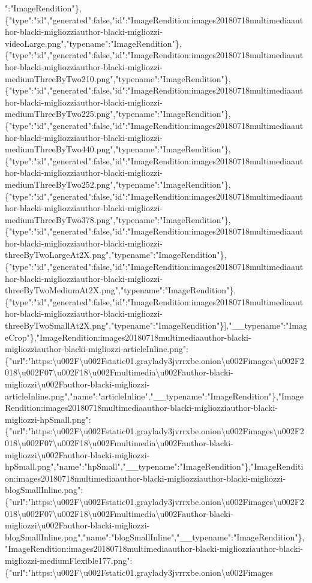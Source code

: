 ":"ImageRendition"\},\{"type":"id","generated":false,"id":"ImageRendition:images20180718multimediaauthor-blacki-migliozziauthor-blacki-migliozzi-videoLarge.png","typename":"ImageRendition"\},\{"type":"id","generated":false,"id":"ImageRendition:images20180718multimediaauthor-blacki-migliozziauthor-blacki-migliozzi-mediumThreeByTwo210.png","typename":"ImageRendition"\},\{"type":"id","generated":false,"id":"ImageRendition:images20180718multimediaauthor-blacki-migliozziauthor-blacki-migliozzi-mediumThreeByTwo225.png","typename":"ImageRendition"\},\{"type":"id","generated":false,"id":"ImageRendition:images20180718multimediaauthor-blacki-migliozziauthor-blacki-migliozzi-mediumThreeByTwo440.png","typename":"ImageRendition"\},\{"type":"id","generated":false,"id":"ImageRendition:images20180718multimediaauthor-blacki-migliozziauthor-blacki-migliozzi-mediumThreeByTwo252.png","typename":"ImageRendition"\},\{"type":"id","generated":false,"id":"ImageRendition:images20180718multimediaauthor-blacki-migliozziauthor-blacki-migliozzi-mediumThreeByTwo378.png","typename":"ImageRendition"\},\{"type":"id","generated":false,"id":"ImageRendition:images20180718multimediaauthor-blacki-migliozziauthor-blacki-migliozzi-threeByTwoLargeAt2X.png","typename":"ImageRendition"\},\{"type":"id","generated":false,"id":"ImageRendition:images20180718multimediaauthor-blacki-migliozziauthor-blacki-migliozzi-threeByTwoMediumAt2X.png","typename":"ImageRendition"\},\{"type":"id","generated":false,"id":"ImageRendition:images20180718multimediaauthor-blacki-migliozziauthor-blacki-migliozzi-threeByTwoSmallAt2X.png","typename":"ImageRendition"\}{]},"\_\_typename":"ImageCrop"\},"ImageRendition:images20180718multimediaauthor-blacki-migliozziauthor-blacki-migliozzi-articleInline.png":\{"url":"https:\textbackslash{}u002F\textbackslash{}u002Fstatic01.graylady3jvrrxbe.onion\textbackslash{}u002Fimages\textbackslash{}u002F2018\textbackslash{}u002F07\textbackslash{}u002F18\textbackslash{}u002Fmultimedia\textbackslash{}u002Fauthor-blacki-migliozzi\textbackslash{}u002Fauthor-blacki-migliozzi-articleInline.png","name":"articleInline","\_\_typename":"ImageRendition"\},"ImageRendition:images20180718multimediaauthor-blacki-migliozziauthor-blacki-migliozzi-hpSmall.png":\{"url":"https:\textbackslash{}u002F\textbackslash{}u002Fstatic01.graylady3jvrrxbe.onion\textbackslash{}u002Fimages\textbackslash{}u002F2018\textbackslash{}u002F07\textbackslash{}u002F18\textbackslash{}u002Fmultimedia\textbackslash{}u002Fauthor-blacki-migliozzi\textbackslash{}u002Fauthor-blacki-migliozzi-hpSmall.png","name":"hpSmall","\_\_typename":"ImageRendition"\},"ImageRendition:images20180718multimediaauthor-blacki-migliozziauthor-blacki-migliozzi-blogSmallInline.png":\{"url":"https:\textbackslash{}u002F\textbackslash{}u002Fstatic01.graylady3jvrrxbe.onion\textbackslash{}u002Fimages\textbackslash{}u002F2018\textbackslash{}u002F07\textbackslash{}u002F18\textbackslash{}u002Fmultimedia\textbackslash{}u002Fauthor-blacki-migliozzi\textbackslash{}u002Fauthor-blacki-migliozzi-blogSmallInline.png","name":"blogSmallInline","\_\_typename":"ImageRendition"\},"ImageRendition:images20180718multimediaauthor-blacki-migliozziauthor-blacki-migliozzi-mediumFlexible177.png":\{"url":"https:\textbackslash{}u002F\textbackslash{}u002Fstatic01.graylady3jvrrxbe.onion\textbackslash{}u002Fimages\te